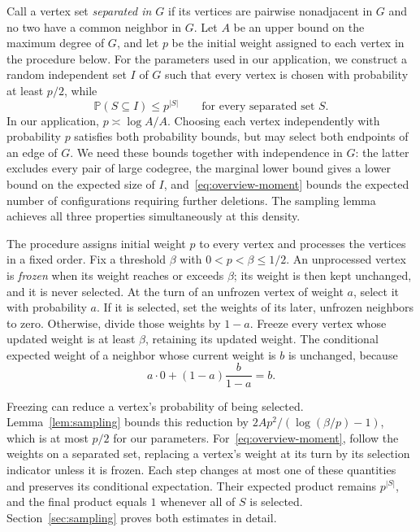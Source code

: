 \documentclass[11pt]{article}
\numberwithin{equation}{section}
\theoremstyle{remark}
\newcommand{\Pp}{\mathbb P}
\begin{document}
Call a vertex set \emph{separated in $G$} if its vertices are pairwise nonadjacent in $G$ and no two have a common neighbor in $G$. Let $A$ be an upper bound on the maximum degree of $G$, and let $p$ be the initial weight assigned to each vertex in the procedure below. For the parameters used in our application, we construct a random independent set $I$ of $G$ such that every vertex is chosen with probability at least $p/2$, while
\begin{equation}\label{eq:overview-moment}
 \Pp(S\subseteq I)\le p^{|S|}
 \qquad\text{for every separated set }S.
\end{equation}
In our application, $p\asymp\log A/A$. Choosing each vertex independently with probability $p$ satisfies both probability bounds, but may select both endpoints of an edge of $G$. We need these bounds together with independence in $G$: the latter excludes every pair of large codegree, the marginal lower bound gives a lower bound on the expected size of $I$, and~\eqref{eq:overview-moment} bounds the expected number of configurations requiring further deletions. The sampling lemma achieves all three properties simultaneously at this density.

The procedure assigns initial weight $p$ to every vertex and processes the vertices in a fixed order. Fix a threshold $\beta$ with $0<p<\beta\le1/2$. An unprocessed vertex is \emph{frozen} when its weight reaches or exceeds $\beta$; its weight is then kept unchanged, and it is never selected. At the turn of an unfrozen vertex of weight $a$, select it with probability $a$. If it is selected, set the weights of its later, unfrozen neighbors to zero. Otherwise, divide those weights by $1-a$. Freeze every vertex whose updated weight is at least $\beta$, retaining its updated weight. The conditional expected weight of a neighbor whose current weight is $b$ is unchanged, because
\[
 a\cdot0+(1-a)\frac{b}{1-a}=b.
\]

Freezing can reduce a vertex's probability of being selected. Lemma~\ref{lem:sampling} bounds this reduction by $2Ap^2/(\log(\beta/p)-1)$, which is at most $p/2$ for our parameters. For~\eqref{eq:overview-moment}, follow the weights on a separated set, replacing a vertex's weight at its turn by its selection indicator unless it is frozen. Each step changes at most one of these quantities and preserves its conditional expectation. Their expected product remains $p^{|S|}$, and the final product equals $1$ whenever all of $S$ is selected. Section~\ref{sec:sampling} proves both estimates in detail.
\end{document}

